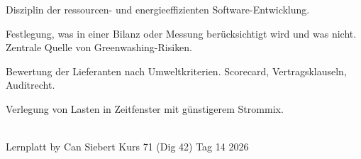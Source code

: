 \documentclass[11pt,a4paper,oneside]{article}
\begin{document}
\begin{description}[style=nextline,leftmargin=0pt,labelindent=0pt,itemsep=4pt]
  \item[SSD (Sustainable Software Development)] Disziplin der ressourcen- und energieeffizienten Software-Entwicklung.
  \item[Systemgrenze] Festlegung, was in einer Bilanz oder Messung berücksichtigt wird und was nicht. Zentrale Quelle von Greenwashing-Risiken.
  \item[Vendor Sustainability] Bewertung der Lieferanten nach Umweltkriterien. Scorecard, Vertragsklauseln, Auditrecht.
  \item[Workload-Shift] Verlegung von Lasten in Zeitfenster mit günstigerem Strommix.
\end{description}

\vspace{1cm}
\noindent{\color{lpAccent}\rule{\linewidth}{0.6pt}}\\[4pt]
{\footnotesize\sffamily\color{lpGray}Lernplatt \textperiodcentered{} by Can Siebert \textperiodcentered{} Kurs 71 (Dig 42) \textperiodcentered{} Tag 14 \textperiodcentered{} \textcopyright{} 2026}
\end{document}
